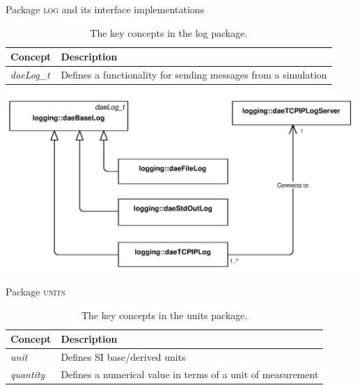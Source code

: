 \documentclass[compress,newPxFont,sthlmFooter]{beamer}
\begin{document}
\begin{frame}{Package \textsc{log} and its interface implementations}
\scriptsize
{
\begin{table}
  \caption{The key concepts in the \alert{log} package.}
  \begin{tabularx}{\linewidth}{l>{\raggedright}X}
    \toprule
    \textcolor{sthlmRed}{\textbf{Concept}} & \textcolor{sthlmRed}{\textbf{Description}} \tabularnewline
    \midrule
    \textcolor{sthlmRed}{\textit{daeLog\_t}} & Defines a functionality for sending messages from a simulation \tabularnewline 
    \bottomrule
  \end{tabularx}
\end{table}
}
    \begin{center}
        \includegraphics[width=0.6\paperwidth]{Supplemental_Figure_S7.png}      
    \end{center}
\end{frame}

\begin{frame}{Package \textsc{units}}
\scriptsize
{
\begin{table}
  \caption{The key concepts in the \alert{units} package.}
  \begin{tabularx}{\linewidth}{l>{\raggedright}X}
    \toprule
    \textcolor{sthlmRed}{\textbf{Concept}} & \textcolor{sthlmRed}{\textbf{Description}} \tabularnewline
    \midrule
    \textcolor{sthlmRed}{\textit{unit}} & Defines SI base/derived units \tabularnewline 
    \textcolor{sthlmRed}{\textit{quantity}} & Defines a numerical value in terms of a unit of measurement \tabularnewline
    \bottomrule
  \end{tabularx}
\end{table}
}
\end{frame}

% 
% 
\end{document}
